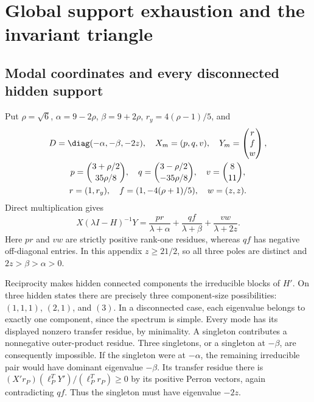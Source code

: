 \section{Global support exhaustion and the invariant triangle}\label{app:cone}
\subsection{Modal coordinates and every disconnected hidden support}
Put $\rho=\sqrt6$, $\alpha=9-2\rho$, $\beta=9+2\rho$,
$r_y=4(\rho-1)/5$, and
\begin{gather}
 D=\diag(-\alpha,-\beta,-2z),\quad X_m=(p,q,v),\quad
 Y_m=\begin{pmatrix}r\\f\\w\end{pmatrix},\label{eq:modal}\\
 p=\binom{3+\rho/2}{35\rho/8},\quad
 q=\binom{3-\rho/2}{-35\rho/8},\quad v=\binom8{11},\\
 r=(1,r_y),\quad f=(1,-4(\rho+1)/5),\quad w=(z,z).
\end{gather}
Direct multiplication gives
\begin{equation}
 X(\lambda I-H)^{-1}Y
 =\frac{pr}{\lambda+\alpha}+\frac{qf}{\lambda+\beta}
  +\frac{vw}{\lambda+2z}.\label{eq:residues}
\end{equation}
Here $pr$ and $vw$ are strictly positive rank-one residues, whereas $qf$
has negative off-diagonal entries. In this appendix $z\ge21/2$, so all
three poles are distinct and $2z>\beta>\alpha>0$.

Reciprocity makes hidden connected components the irreducible blocks of
$H'$. On three hidden states there are precisely three component-size
possibilities: $(1,1,1)$, $(2,1)$, and $(3)$. In a disconnected case,
each eigenvalue belongs to exactly one component, since the spectrum is
simple. Every mode has its displayed nonzero transfer residue, by
minimality. A singleton contributes a nonnegative outer-product residue.
Three singletons, or a singleton at $-\beta$, are consequently impossible.
If the singleton were at $-\alpha$, the remaining irreducible pair would
have dominant eigenvalue $-\beta$. Its transfer residue there is
$(X'r_P)(\ell_P^TY')/(\ell_P^Tr_P)\ge0$ by its positive Perron vectors,
again contradicting $qf$. Thus the singleton must have eigenvalue $-2z$.

